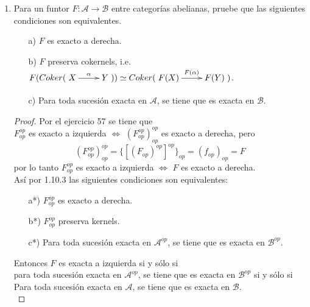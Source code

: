 \documentclass{article}
\begin{document}
\begin{enumerate}[label=\textbf{Ej \arabic*.}]
\begin{proof}
\end{proof}

\item Para un funtor $F:\mathscr{A}\longrightarrow \mathscr{B}$ entre categorías abelianas, pruebe que las siguientes condiciones son equivalentes.

\begin{itemize}
\item[a)] $F$ es exacto a derecha.
\item[b)] $F$ preserva cokernels, i.e.\\
 $F(Coker(\xymatrix{X\ar[r]^\alpha& Y}))\simeq Coker(\xymatrix{F(X)\ar[r]^{F(\alpha)}& F(Y)})$.
\item[c)] Para toda sucesión exacta  en $\mathscr{A}$, se tiene que 
 es exacta en $\mathscr{B}$.
\end{itemize}
\begin{proof}
 Por el ejercicio 57 se tiene que \\$F_{op}^{op}$ es exacto a izquierda $\iff$ $(F_{op}^{op})^{op}_{op}$ es exacto a derecha,
pero \[(F_{op}^{op})^{op}_{op}=\{[(F_{op})^{op}]^{op}\}_{op}=(f_{op})_{op}=F\] por lo tanto 
 $F_{op}^{op}$ es exacto a izquierda $\iff$ $F$ es exacto a derecha.\\

Así por 1.10.3 las siguientes condiciones son equivalentes:

\begin{itemize}
\item[a*)] $F_{op}^{op}$ es exacto a derecha.
\item[b*)] $F_{op}^{op}$ preserva kernels.
\item[c*)] Para toda sucesión exacta  en $\mathscr{A}^{op}$, se tiene que 
 es exacta 
en $\mathscr{B}^{op}$.
\end{itemize}

Entonces $F$ es exacta a izquierda si y sólo si \\
para toda sucesión exacta  en $\mathscr{A}^{op}$, se tiene que 
 es exacta 
en $\mathscr{B}^{op}$ si y sólo si\\
Para toda sucesión exacta  en $\mathscr{A}$, se tiene que 
 es exacta 
en $\mathscr{B}$.\\


\end{proof}
\end{enumerate}
\end{document}
